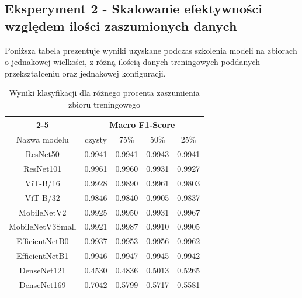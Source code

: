 \subsection{ Eksperyment 2 - Skalowanie efektywności względem ilości zaszumionych danych}
Poniższa tabela prezentuje wyniki uzyskane podczas szkolenia modeli na zbiorach \newline o jednakowej wielkości, z różną ilością danych treningowych poddanych przekształceniu oraz jednakowej konfiguracji.
\begin{table}[H]
	\centering
	\begin{tabular}{|c|cccc|}
		\cline{2-5}
		\multicolumn{1}{c|}{} & \multicolumn{4}{c|}{Macro F1-Score} \\ \hline
		Nazwa modelu & \multicolumn{1}{c|}{czysty} & \multicolumn{1}{c|}{75\% } & \multicolumn{1}{c|}{50\% } & 25\%  \\ \hline
		ResNet50 & \multicolumn{1}{c|}{0.9941} & \multicolumn{1}{c|}{0.9941} & \multicolumn{1}{c|}{0.9943} & 0.9941 \\ \hline
		ResNet101 & \multicolumn{1}{c|}{0.9961} & \multicolumn{1}{c|}{0.9960} & \multicolumn{1}{c|}{0.9931} & 0.9927 \\ \hline
		ViT-B/16 & \multicolumn{1}{c|}{0.9928} & \multicolumn{1}{c|}{0.9890} & \multicolumn{1}{c|}{0.9961} & 0.9803 \\ \hline
		ViT-B/32 & \multicolumn{1}{c|}{0.9846} & \multicolumn{1}{c|}{0.9840} & \multicolumn{1}{c|}{0.9905} & 0.9837 \\ \hline
		MobileNetV2 & \multicolumn{1}{c|}{0.9925} & \multicolumn{1}{c|}{0.9950} & \multicolumn{1}{c|}{0.9931} & 0.9967 \\ \hline
		MobileNetV3Small & \multicolumn{1}{c|}{0.9921} & \multicolumn{1}{c|}{0.9987} & \multicolumn{1}{c|}{0.9910} & 0.9905 \\ \hline
		EfficientNetB0 & \multicolumn{1}{c|}{0.9937} & \multicolumn{1}{c|}{0.9953} & \multicolumn{1}{c|}{0.9956} & 0.9962 \\ \hline
		EfficientNetB1 & \multicolumn{1}{c|}{0.9946} & \multicolumn{1}{c|}{0.9947} & \multicolumn{1}{c|}{0.9945} & 0.9942 \\ \hline
		DenseNet121 & \multicolumn{1}{c|}{0.4530} & \multicolumn{1}{c|}{0.4836} & \multicolumn{1}{c|}{0.5013} & 0.5265 \\ \hline
DenseNet169 & \multicolumn{1}{c|}{0.7042} & \multicolumn{1}{c|}{0.5799} & \multicolumn{1}{c|}{0.5717} & 0.5581 \\ \hline
	
	\end{tabular}
\caption{Wyniki klasyfikacji dla różnego procenta zaszumienia zbioru treningowego}
\label{tab:model_noise}
\end{table}


